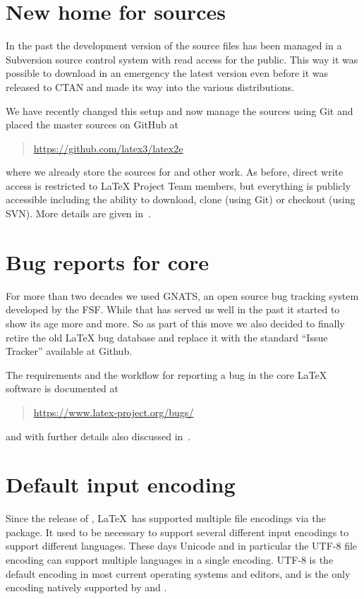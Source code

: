 \documentclass{ltnews}
\begin{document}
\maketitle
\tableofcontents

\setlength{}

\section{New home for \LaTeXe{} sources}

In the past the development version of the \LaTeXe{} source files has
been managed in a Subversion source control system with read access
for the public. This way it was possible to download in an emergency
the latest version even before it was released to CTAN and made its
way into the various distributions.

We have recently changed this setup and now manage the sources using
Git and placed the master sources on GitHub at
\begin{quote}
\url{https://github.com/latex3/latex2e}
\end{quote}
where we already store the sources
for  and other work. As before, direct write access is restricted
to \LaTeX{} Project Team members, but everything is publicly accessible
including the ability to download, clone (using Git) or checkout
(using SVN). More details are given in~\cite{Mittelbach:TB39-1}.

\section{Bug reports for core \LaTeXe{}}

For more than two decades we used GNATS, an open source bug tracking
system developed by the FSF. While that has served us well in the past
it started to show its age more and more. So as part of this move we
also decided to finally retire the old \LaTeX{} bug database and replace
it with the standard ``Issue Tracker'' available at Github.

The requirements and the workflow for reporting a bug in the core
\LaTeX{} software is documented at
\begin{quote}
\url{https://www.latex-project.org/bugs/}
\end{quote}
and with further details also discussed in~\cite{Mittelbach:TB39-1}.

\section{Default input encoding}
Since the release of \LaTeXe, \LaTeX\ has supported multiple file encodings
via the  package. It used to be necessary to support several
different input encodings to support different languages. These days Unicode
and in particular the UTF-8 file encoding can support multiple languages
in a single encoding. UTF-8 is the default  encoding in most current operating
systems and editors, and is the only encoding natively supported by
 and .
\end{document}
